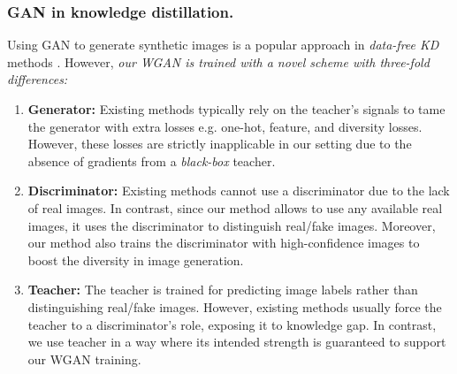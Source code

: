 \subsubsection{GAN in knowledge distillation.}
\begin{foldable}
    Using GAN to generate synthetic images is a popular approach in \textit{data-free KD} methods \cite{chen2019data,addepalli2020degan,do2022momentum,zhang2022ideal}.
    However, \textit{our WGAN is trained with a novel scheme with three-fold differences:}
\end{foldable}
\begin{enumerate}
    \item \textbf{Generator:} Existing methods typically rely on the teacher's signals to tame the generator with extra losses e.g. one-hot, feature, and diversity losses. However, these losses are strictly inapplicable in our setting due to the absence of gradients from a \textit{black-box} teacher.
    \item \textbf{Discriminator:} Existing methods cannot use a discriminator due to the lack of real images. In contrast, since our method allows to use any available real images, it uses the discriminator to distinguish real/fake images. Moreover, our method also trains the discriminator with high-confidence images to boost the diversity in image generation.
    \item \textbf{Teacher:} The teacher is trained for predicting image labels rather than distinguishing real/fake images. However, existing methods usually force the teacher to a discriminator's role, exposing it to knowledge gap. In contrast, we use teacher in a way where its intended strength is guaranteed to support our WGAN training.
\end{enumerate}

